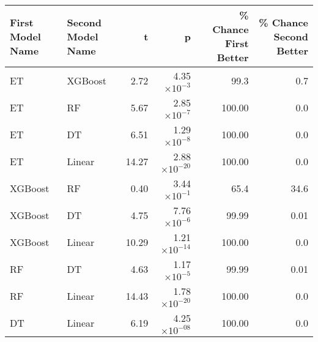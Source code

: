 \begin{tabular}{llrrrr}
\toprule
First Model Name & Second Model Name &     t &            p &  \% Chance First Better &  \% Chance Second Better \\
\midrule
ET &           XGBoost &  2.72 & 4.35$\times10^{-3}$ &                  99.3 &                    0.7 \\
ET &                RF &  5.67 & 2.85$\times10^{-7}$ &                 100.00 &                    0.0 \\
ET &                DT &  6.51 & 1.29$\times10^{-8}$ &                 100.00 &                    0.0 \\
ET &            Linear & 14.27 & 2.88$\times10^{-20}$ &                 100.00 &                    0.0 \\
XGBoost &                RF &  0.40 & 3.44$\times10^{-1}$ &                  65.4 &                   34.6 \\
XGBoost &                DT &  4.75 & 7.76$\times10^{-6}$ &                  99.99 &                    0.01 \\
XGBoost &            Linear & 10.29 & 1.21$\times10^{-14}$ &                 100.00 &                    0.0 \\
RF &                DT &  4.63 & 1.17$\times10^{-5}$ &                  99.99 &                    0.01 \\
RF &            Linear & 14.43 & 1.78$\times10^{-20}$ &                 100.00 &                    0.0 \\
DT &            Linear &  6.19 & 4.25$\times10^{-08}$ &                 100.00 &                    0.0 \\
\bottomrule
\end{tabular}
